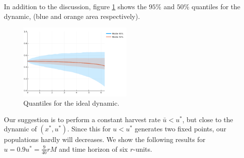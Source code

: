 In addition to the discussion, figure \ref{fig: NoiseIdealConstant2} shows the $95\%$ and $50\%$ quantiles for the dynamic, (blue and orange area respectively).

\begin{figure}[H]
	\begin{center}
		\includegraphics[width=0.5\textwidth]{NoiseIdealDynamic2.png}
		\caption{Quantiles for the ideal dynamic.}
		\label{fig: NoiseIdealConstant2}
	\end{center}
\end{figure}

Our suggestion is to perform a constant harvest rate $\bar{u}<u^*$, but close to the dynamic of $(x^*,u^*)$. Since this for $u<u^*$ generates two fixed points, our populations hardly will decreases. We show the following results for $u=0.9u^*=\frac{9}{40}rM$ and time horizon of six $r$-units. 

